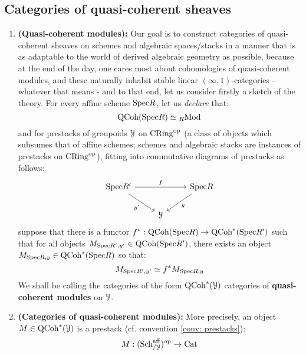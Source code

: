         \subsection{Categories of quasi-coherent sheaves}
            \begin{definition} \label{def: qcoh_def}
                \noindent
                \begin{enumerate}
                    \item \textbf{(Quasi-coherent modules):} Our goal is to construct categories of quasi-coherent sheaves on schemes and algebraic spaces/stacks in a manner that is as adaptable to the world of derived algebraic geometry as possible, because at the end of the day, one cares most about cohomologies of quasi-coherent modules, and these  naturally inhabit stable linear $(\infty,1)$-categories - whatever that means - and to that end, let us consider firstly a sketch of the theory. For every affine scheme $\mathrm{Spec} R$, let us \textit{declare} that:
                        $$\mathrm{QCoh}(\mathrm{Spec} R) \simeq {}_R\mathrm{Mod}$$
                    and for prestacks of groupoids $\mathcal{Y}$ on $\mathrm{CRing}^{\mathrm{op}}$ (a class of objects which subsumes that of affine schemes; schemes and algebraic stacks are instances of prestacks on $\mathrm{CRing}^{\mathrm{op}}$), fitting into commutative diagrams of prestacks as follows:
                        $$
                            \begin{tikzcd}
                            	{\Spec R'} && {\Spec R} \\
                            	& \calY
                            	\arrow["{y'}"', from=1-1, to=2-2]
                            	\arrow["y", from=1-3, to=2-2]
                            	\arrow["f", from=1-1, to=1-3]
                            \end{tikzcd}
                        $$
                    suppose that there is a functor $f^*: \mathrm{QCoh}(\mathrm{Spec} R) \to \mathrm{QCoh}^*(\mathrm{Spec} R')$ such that for all objects $M_{\mathrm{Spec} R', y'} \in \mathrm{QCoh}(\mathrm{Spec} R')$, there exists an object $M_{\mathrm{Spec} R, y} \in \mathrm{QCoh}^*(\mathrm{Spec} R)$ so that:
                        $$M_{\mathrm{Spec} R', y'} \simeq f^* M_{\mathrm{Spec} R, y}$$
                    We shall be calling the categories of the form $\mathrm{QCoh}^*(\mathcal{Y})$ categories of \textbf{quasi-coherent modules} on $\mathcal{Y}$.
                    \item \textbf{(Categories of quasi-coherent modules):} More precisely, an object $M \in \mathrm{QCoh}^*(\mathcal{Y})$ is a prestack (cf. convention \ref{conv: prestacks}):
                        $$M: (\mathrm{Sch}^{\mathrm{aff}}_{/\mathcal{Y}})^{\mathrm{op}} \to \mathrm{Cat}$$

\end{enumerate}
\end{definition}
